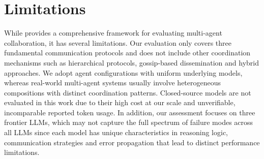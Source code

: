 \section*{Limitations}
While \silobench{} provides a comprehensive framework for evaluating multi-agent collaboration, it has several limitations. Our evaluation only covers three fundamental communication protocols and does not include other coordination mechanisms such as hierarchical protocols, gossip-based dissemination and hybrid approaches. We adopt agent configurations with uniform underlying models, whereas real-world multi-agent systems usually involve heterogeneous compositions with distinct coordination patterns. Closed-source models are not evaluated in this work due to their high cost at our scale and unverifiable, incomparable reported token usage. In addition, our assessment focuses on three frontier LLMs, which may not capture the full spectrum of failure modes across all LLMs since each model has unique characteristics in reasoning logic, communication strategies and error propagation that lead to distinct performance limitations.